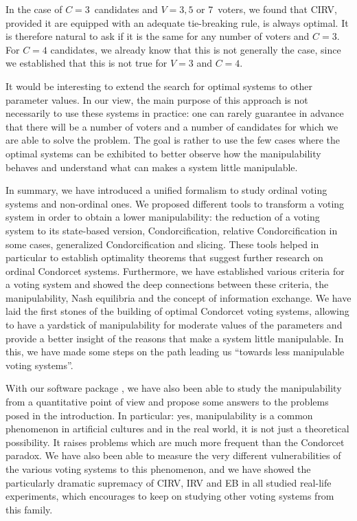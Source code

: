 In the case of $C = 3$~candidates and $V = 3, 5$ or 7~voters, we found that CIRV, provided it are equipped with an adequate tie-breaking rule, is always optimal. It is therefore natural to ask if it is the same for any number of voters and $C = 3$. For $C = 4$ candidates, we already know that this is not generally the case, since we established that this is not true for $V = 3$ and $C = 4$.

It would be interesting to extend the search for optimal systems to other parameter values. In our view, the main purpose of this approach is not necessarily to use these systems in practice: one can rarely guarantee in advance that there will be a number of voters and a number of candidates for which we are able to solve the problem. The goal is rather to use the few cases where the optimal systems can be exhibited to better observe how the manipulability behaves and understand what can makes a system little manipulable.

\medskip
In summary, we have introduced a unified formalism to study ordinal voting systems and non-ordinal ones. We proposed different tools to transform a voting system in order to obtain a lower manipulability: the reduction of a voting system to its state-based version, Condorcification, relative Condorcification in some cases, generalized Condorcification and slicing. These tools helped in particular to establish optimality theorems that suggest further research on ordinal Condorcet systems. Furthermore, we have established various criteria for a voting system and showed the deep connections between these criteria, the manipulability, Nash equilibria and the concept of information exchange. We have laid the first stones of the building of optimal Condorcet voting systems, allowing to have a yardstick of manipulability for moderate values of the parameters and provide a better insight of the reasons that make a system little manipulable. In this, we have made some steps on the path leading us ``towards less manipulable voting systems''.

With our software package \svvamp{}, we have also been able to study the manipulability from a quantitative point of view and propose some answers to the problems posed in the introduction. In particular: yes, manipulability is a common phenomenon in artificial cultures and in the real world, it is not just a theoretical possibility. It raises problems which are much more frequent than the Condorcet paradox. We have also been able to measure the very different vulnerabilities of the various voting systems to this phenomenon, and we have showed the particularly dramatic supremacy of CIRV, IRV and EB in all studied real-life experiments, which encourages to keep on studying other voting systems from this family.

